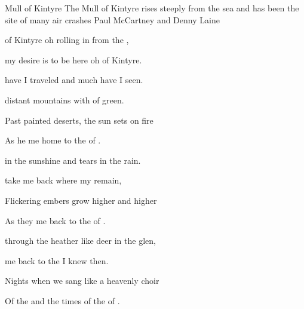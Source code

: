 \begin{SBSong}{Mull of Kintyre}
  {The Mull of Kintyre rises steeply from the sea and has been the site of many air crashes}
  {Paul McCartney and Denny Laine}
  \begin{SBChorus}
     of Kintyre oh  rolling in from the ,

    my desire is  to be here oh  of Kintyre.
  \end{SBChorus}
  \begin{SBVerse}
     have I traveled and much have I seen.

     distant mountains with  of green.

    Past painted deserts, the sun sets on fire

    As he  me home to the  of .
  \end{SBVerse}
  \begin{SBVerse}
     in the sunshine and tears in the rain.

     take me back where my  remain,

    Flickering embers grow higher and higher

    As they  me back to the  of .
  \end{SBVerse}
  \begin{SBVerse}
     through the heather like deer in the glen,

     me back to the  I knew then.

    Nights when we sang like a heavenly choir

    Of the  and the times of the  of .
  \end{SBVerse}
\end{SBSong}
